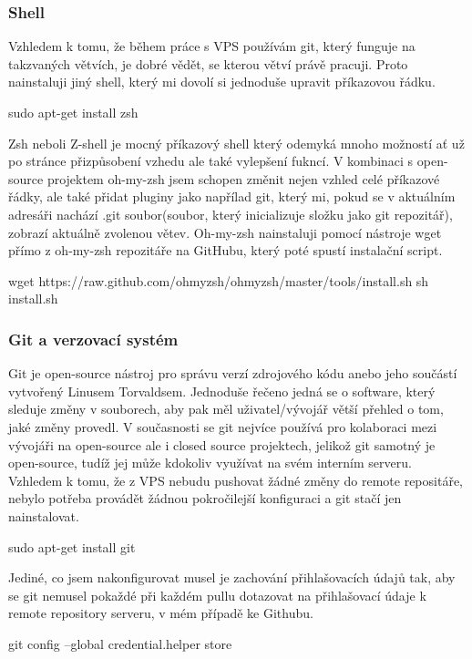 \documentclass[12pt,a4paper]{report}
\begin{document}
  \subsubsection{Shell}
  Vzhledem k tomu, že během práce s VPS používám git, který funguje na takzvaných větvích, je dobré vědět, se kterou větví právě pracuji.
  Proto nainstaluji jiný shell, který mi dovolí si jednoduše upravit příkazovou řádku.
  \begin{bash}
    sudo apt-get install zsh
  \end{bash}
  Zsh neboli Z-shell je mocný příkazový shell který odemyká mnoho možností ať už po stránce přizpůsobení vzhedu ale také vylepšení fukncí.
  V kombinaci s open-source projektem oh-my-zsh jsem schopen změnit nejen vzhled celé příkazové řádky, ale také přidat pluginy jako napřílad git, který mi, pokud se v aktuálním adresáři nachází .git soubor(soubor, který inicializuje složku jako git repozitář), zobrazí aktuálně zvolenou větev. Oh-my-zsh nainstaluji pomocí nástroje wget přímo z oh-my-zsh repozitáře na GitHubu, který poté spustí instalační script.
  
  \begin{bash}
    wget https://raw.github.com/ohmyzsh/ohmyzsh/master/tools/install.sh
    sh install.sh
  \end{bash}

  \subsubsection{Git a verzovací systém}
  Git je open-source nástroj pro správu verzí zdrojového kódu anebo jeho součástí vytvořený Linusem Torvaldsem. Jednoduše řečeno jedná se o software, který sleduje změny v souborech, aby pak měl uživatel/vývojář 
  větší přehled o tom, jaké změny provedl. V současnosti se git nejvíce používá pro kolaboraci mezi vývojáři na open-source ale i closed source projektech, jelikož git samotný je open-source, tudíž jej může kdokoliv využívat na svém interním serveru.
  Vzhledem k tomu, že z VPS nebudu pushovat žádné změny do remote repositáře, nebylo potřeba provádět žádnou pokročilejší konfiguraci a git stačí jen nainstalovat.
  \begin{bash}
    sudo apt-get install git
  \end{bash}
  Jediné, co jsem nakonfigurovat musel je zachování přihlašovacích údajů tak, aby se git nemusel pokaždé při každém pullu dotazovat na přihlašovací údaje k remote repository serveru, v mém případě ke Githubu.
  \begin{bash}
    git config --global credential.helper store
  \end{bash}
\end{document}
